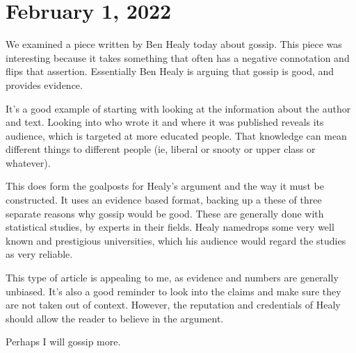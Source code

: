 \documentclass[journal.tex]{subfiles}
\begin{document}
\pagebreak
\section*{February 1, 2022}

We examined a piece written by Ben Healy today about gossip.
This piece was interesting because it takes something that often has a negative connotation and flips that assertion.
Essentially Ben Healy is arguing that gossip is good, and provides evidence.

It's a good example of starting with looking at the information about the author and text.
Looking into who wrote it and where it was published reveals its audience, which is targeted at more educated people.
That knowledge can mean different things to different people (ie, liberal or snooty or upper class or whatever).

This does form the goalposts for Healy's argument and the way it must be constructed.
It uses an evidence based format, backing up a these of three separate reasons why gossip would be good.
These are generally done with statistical studies, by experts in their fields.
Healy namedrops some very well known and prestigious universities, which his audience would regard the studies as very reliable.

This type of article is appealing to me, as evidence and numbers are generally unbiased.
It's also a good reminder to look into the claims and make sure they are not taken out of context.
However, the reputation and credentials of Healy should allow the reader to believe in the argument.

Perhaps I will gossip more.
\end{document}
